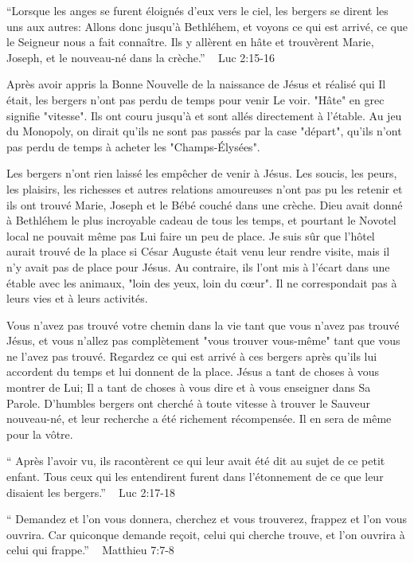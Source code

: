 

“Lorsque les anges se furent éloignés d’eux vers le ciel, les bergers se dirent les uns aux autres: Allons donc jusqu’à Bethléhem, et voyons ce qui est arrivé, ce que le Seigneur nous a fait connaître. Ils y allèrent en hâte et trouvèrent Marie, Joseph, et le nouveau-né dans la crèche.”
                                                 ~ Luc 2:15-16

Après avoir appris la Bonne Nouvelle de la naissance de Jésus et réalisé qui Il était, les bergers n'ont pas perdu de temps pour venir Le voir. "Hâte" en grec signifie "vitesse". Ils ont couru jusqu'à et sont allés directement à l'étable. Au jeu du Monopoly, on dirait qu'ils ne sont pas passés par la case "départ", qu'ils n'ont pas perdu de temps à acheter les "Champs-Élysées".

Les bergers n'ont rien laissé les empêcher de venir à Jésus. Les soucis, les peurs, les plaisirs, les richesses et autres relations amoureuses n'ont pas pu les retenir et ils ont trouvé Marie, Joseph et le Bébé couché dans une crèche. Dieu avait donné à Bethléhem le plus incroyable cadeau de tous les temps, et pourtant le Novotel local ne pouvait même pas Lui faire un peu de place. Je suis sûr que l'hôtel aurait trouvé de la place si César Auguste était venu leur rendre visite, mais il n'y avait pas de place pour Jésus. Au contraire, ils l'ont mis à l'écart dans une étable avec les animaux, "loin des yeux, loin du cœur". Il ne correspondait pas à leurs vies et à leurs activités.

Vous n'avez pas trouvé votre chemin dans la vie tant que vous n'avez pas trouvé Jésus, et vous n'allez pas complètement "vous trouver vous-même" tant que vous ne l'avez pas trouvé. Regardez ce qui est arrivé à ces bergers après qu'ils lui accordent du temps et lui donnent de la place. Jésus a tant de choses à vous montrer de Lui; Il a tant de choses à vous dire et à vous enseigner dans Sa Parole. D'humbles bergers ont cherché à toute vitesse à trouver le Sauveur nouveau-né, et leur recherche a été richement récompensée. Il en sera de même pour la vôtre.


“ Après l’avoir vu, ils racontèrent ce qui leur avait été dit au sujet de ce petit enfant. Tous ceux qui les entendirent furent dans l’étonnement de ce que leur disaient les bergers.”
                                                  ~ Luc 2:17-18

“ Demandez et l’on vous donnera, cherchez et vous trouverez, frappez et l’on vous ouvrira. Car quiconque demande reçoit, celui qui cherche trouve, et l’on ouvrira à celui qui frappe.” ~ Matthieu 7:7-8

